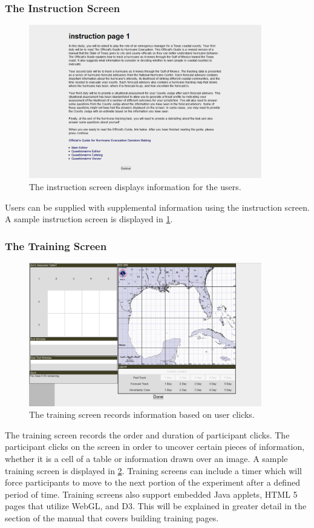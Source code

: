 \documentclass[article]{ij4uq}              %
\begin{document}
\subsubsection{The Instruction Screen}

\begin{figure}[h!]
 \centering
 \includegraphics[width=4.0in]{figures/instruction_page.png}
 \caption{The instruction screen displays information for the users.}
 \label{fig:inst}
\end{figure}
\FloatBarrier

Users can be supplied with supplemental information using the instruction screen. A sample instruction screen is displayed in \ref{fig:inst}. 

\subsubsection{The Training Screen}

\begin{figure}[h!]
 \centering
 \includegraphics[width=4.0in]{figures/training_page.png}
 \caption{The training screen records information based on user clicks.}
 \label{fig:train}
\end{figure}
\FloatBarrier

The training screen records the order and duration of participant clicks. The participant clicks on the screen in order to uncover certain pieces of information, whether it is a cell of a table or information drawn over an image. A sample training screen is displayed in \ref{fig:train}.  Training screens can include a timer which will force participants to move to the next portion of the experiment after a defined period of time.  Training screens also support embedded Java applets, HTML 5 pages that utilize WebGL, and D3.  This will be explained in greater detail in the section of the manual that covers building training pages.
\end{document}
